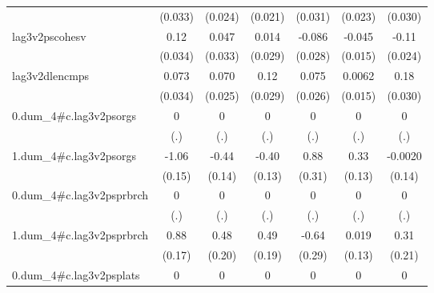 \begin{table}[htbp]
\begin{tabular}{l*{6}{c}}
            &     (0.033)         &     (0.024)         &     (0.021)         &     (0.031)         &     (0.023)         &     (0.030)         \\
[1em]
lag3v2pscohesv&        0.12\sym{***}&       0.047         &       0.014         &      -0.086\sym{**} &      -0.045\sym{**} &       -0.11\sym{***}\\
            &     (0.034)         &     (0.033)         &     (0.029)         &     (0.028)         &     (0.015)         &     (0.024)         \\
[1em]
lag3v2dlencmps&       0.073\sym{*}  &       0.070\sym{**} &        0.12\sym{***}&       0.075\sym{**} &      0.0062         &        0.18\sym{***}\\
            &     (0.034)         &     (0.025)         &     (0.029)         &     (0.026)         &     (0.015)         &     (0.030)         \\
[1em]
0.dum\_4#c.lag3v2psorgs&           0         &           0         &           0         &           0         &           0         &           0         \\
            &         (.)         &         (.)         &         (.)         &         (.)         &         (.)         &         (.)         \\
[1em]
1.dum\_4#c.lag3v2psorgs&       -1.06\sym{***}&       -0.44\sym{**} &       -0.40\sym{**} &        0.88\sym{**} &        0.33\sym{*}  &     -0.0020         \\
            &      (0.15)         &      (0.14)         &      (0.13)         &      (0.31)         &      (0.13)         &      (0.14)         \\
[1em]
0.dum\_4#c.lag3v2psprbrch&           0         &           0         &           0         &           0         &           0         &           0         \\
            &         (.)         &         (.)         &         (.)         &         (.)         &         (.)         &         (.)         \\
[1em]
1.dum\_4#c.lag3v2psprbrch&        0.88\sym{***}&        0.48\sym{*}  &        0.49\sym{**} &       -0.64\sym{*}  &       0.019         &        0.31         \\
            &      (0.17)         &      (0.20)         &      (0.19)         &      (0.29)         &      (0.13)         &      (0.21)         \\
[1em]
0.dum\_4#c.lag3v2psplats&           0         &           0         &           0         &           0         &           0         &           0         \\

\end{tabular}
\end{table}
